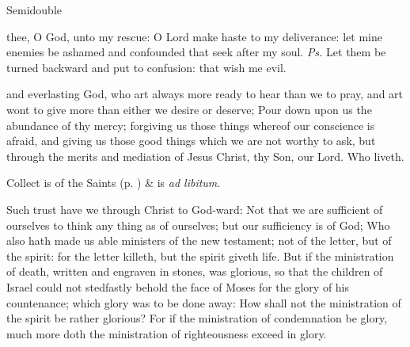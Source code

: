 \begin{inhead}
{Semidouble}
\end{inhead}
\par\noindent
{}


\properantiphonfix

\introit
{} thee, O God, unto my rescue: O Lord make haste to my deliverance: let mine enemies be ashamed and confounded that seek after my soul. \textit{Ps.} Let them be turned backward and put to confusion: that wish me evil.

\vspace{-1ex}

\collect
{} and everlasting God, who art always more ready to hear than we to pray, and art wont to give more than either we desire or deserve; Pour down upon us the abundance of thy mercy; forgiving us those things whereof our conscience is afraid, and giving us those good things which we are not worthy to ask, but through the merits and mediation of Jesus Christ, thy Son, our Lord. Who liveth.
\begin{rubric}
     Collect is of the Saints (p. \pageref{SPSaints}) \&  is \emph{ad libitum}.
\end{rubric}

 Such trust have we through Christ to God-ward: Not that we are sufficient of ourselves to think any thing as of ourselves; but our sufficiency is of God; Who also hath made us able ministers of the new testament; not of the letter, but of the spirit: for the letter killeth, but the spirit giveth life. But if the ministration of death, written and engraven in stones, was glorious, so that the children of Israel could not stedfastly behold the face of Moses for the glory of his countenance; which glory was to be done away: How shall not the ministration of the spirit be rather glorious? For if the ministration of condemnation be glory, much more doth the ministration of righteousness exceed in glory.


